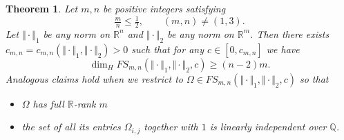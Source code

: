 \documentclass[10pt]{amsart}
\newtheorem{theorem}{Theorem}[section]
\theoremstyle{definition}
\newcommand{\R}{\mathbb{R}}
\newcommand{\Q}{\mathbb{Q}}
\begin{document}


\begin{theorem}  \label{thm5}
	Let $m,n$ be positive integers satisfying
	\begin{equation} \label{matrix dimension condition}
 	\tfrac{m}{n}\le \tfrac{1}{2}, 
 \qquad (m,n)\ne (1,3).
	\end{equation}
	Let $\Vert\cdot\Vert_1$ be any norm on $\R^n$ and $\Vert\cdot\Vert_2$ be any 
	norm 
	on $\R^m$. Then there exists $c_{m,n}=c_{m,n}(\Vert\cdot\Vert_1,\Vert\cdot\Vert_2)>0$ such that for any $c\in[0,c_{m,n}]$ we have
 \begin{equation*}
 \dim_H FS_{m,n}(\Vert\cdot\Vert_1,\Vert\cdot\Vert_2,c) \geq (n-2)m.  
 \end{equation*}
 Analogous claims hold when we restrict to $\Omega\in FS_{m,n}(\Vert\cdot\Vert_1,\Vert\cdot\Vert_2,c)$ so that 
 \begin{itemize}
     \item[(i)]  $\Omega$
     has full $\R$-rank $m$
     \item[(ii)] the set of all its entries $\Omega_{i,j}$ together with $1$ is linearly independent over $\Q$.
 \end{itemize}
\end{theorem}
\end{document}
